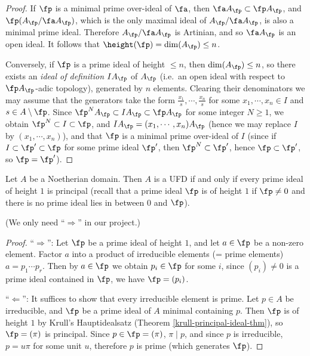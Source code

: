 \begin{proof}
\leanok
If $\fp$ is a minimal prime over-ideal of $\fa$, then $\fa A_\fp\subset\fp A_\fp$,
and $\fp(A_\fp/\fa A_\fp)$, which is the only maximal ideal of
$A_\fp/\fa A_\fp$, is also a minimal prime ideal.
Therefore $A_\fp/\fa A_\fp$ is Artinian, and so
$\fa A_\fp$ is an open ideal. It follows that $\height(\fp)=\dim(A_\fp)\leq n$.

Conversely, if $\fp$ is a prime ideal of height $\leq n$,
then $\dim(A_\fp)\leq n$, so there exists an \emph{ideal of definition}
$IA_\fp$ of $A_\fp$
(i.e.~an open ideal with respect to $\fp A_\fp$-adic topology),
generated by $n$ elements.
Clearing their denominators we may assume that the generators take the form
$\frac{x_1}s,\cdots,\frac{x_n}s$ for some $x_1,\cdots,x_n\in I$
and $s\in A\setminus\fp$.
Since $\fp^NA_\fp\subset IA_\fp\subset\fp A_\fp$ for some integer $N\geq 1$,
we obtain $\fp^N\subset I\subset\fp$, and
$IA_\fp=(x_1,\cdots,x_n)A_\fp$
(hence we may replace $I$ by $(x_1,\cdots,x_n)$), and that $\fp$ is a minimal prime over-ideal of $I$
(since if $I\subset\fp'\subset\fp$ for some prime ideal $\fp'$,
then $\fp^N\subset\fp'$, hence $\fp\subset\fp'$, so $\fp=\fp'$).
\end{proof}

\begin{thm}
\label{UFD-iff-ht-1-principal}
\leanok
Let $A$ be a Noetherian domain. Then $A$ is a UFD if and only if every prime ideal of height $1$ is principal
(recall that a prime ideal $\fp$ is of height $1$ if $\fp \neq 0$ and there is no prime ideal lies in between $0$ and $\fp$).

(We only need ``$\Rightarrow$'' in our project.)
\end{thm}

\begin{proof}
\leanok
``$\Rightarrow$'':
Let $\fp$ be a prime ideal of height $1$,
and let $a\in\fp$ be a non-zero element.
Factor $a$ into a product of irreducible elements
(= prime elements) $a=p_1\cdots p_r$.
Then by $a\in\fp$ we obtain $p_i\in\fp$ for some $i$,
since $(p_i)\neq 0$ is a prime ideal contained in $\fp$, we have $\fp=(p_i)$.

``$\Leftarrow$'':
It suffices to show that every irreducible element is prime.
Let $p\in A$ be irreducible, and $\fp$ be a prime ideal of $A$ minimal containing $p$.
Then $\fp$ is of height $1$ by Krull's Hauptidealsatz
(Theorem \ref{krull-principal-ideal-thm}),
so $\fp=(\pi)$ is principal.
Since $p\in\fp=(\pi)$, $\pi\mid p$, and since $p$ is irreducible,
$p=u\pi$ for some unit $u$, therefore $p$ is prime (which generates $\fp$).
\end{proof}

